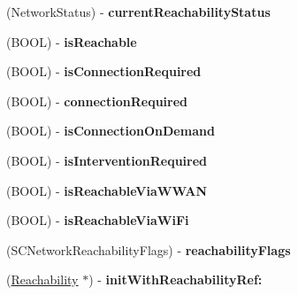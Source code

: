 \begin{DoxyCompactItemize}
\item 
\hypertarget{interface_reachability_a8396438436e7ff3770039fb527cd1d34}{
(\-Network\-Status) -\/ {\bfseries current\-Reachability\-Status}}
\label{interface_reachability_a8396438436e7ff3770039fb527cd1d34}

\item 
\hypertarget{interface_reachability_ae0b18fcacc97f538502cf671aa583dbd}{
(\-B\-O\-O\-L) -\/ {\bfseries is\-Reachable}}
\label{interface_reachability_ae0b18fcacc97f538502cf671aa583dbd}

\item 
\hypertarget{interface_reachability_a294f9407cd32a05f26a480871df70901}{
(\-B\-O\-O\-L) -\/ {\bfseries is\-Connection\-Required}}
\label{interface_reachability_a294f9407cd32a05f26a480871df70901}

\item 
\hypertarget{interface_reachability_a731496d70dd8bfbd1b364df13cac2b4c}{
(\-B\-O\-O\-L) -\/ {\bfseries connection\-Required}}
\label{interface_reachability_a731496d70dd8bfbd1b364df13cac2b4c}

\item 
\hypertarget{interface_reachability_af5bea7c2cfd6439a4ff5f0ab0b92e37b}{
(\-B\-O\-O\-L) -\/ {\bfseries is\-Connection\-On\-Demand}}
\label{interface_reachability_af5bea7c2cfd6439a4ff5f0ab0b92e37b}

\item 
\hypertarget{interface_reachability_ad44af2ebf5ffd986dacad06e63362550}{
(\-B\-O\-O\-L) -\/ {\bfseries is\-Intervention\-Required}}
\label{interface_reachability_ad44af2ebf5ffd986dacad06e63362550}

\item 
\hypertarget{interface_reachability_a20011128b407d36659bc78a64cd583f5}{
(\-B\-O\-O\-L) -\/ {\bfseries is\-Reachable\-Via\-W\-W\-A\-N}}
\label{interface_reachability_a20011128b407d36659bc78a64cd583f5}

\item 
\hypertarget{interface_reachability_a994f39db8e47480480ffd7ee81159ecb}{
(\-B\-O\-O\-L) -\/ {\bfseries is\-Reachable\-Via\-Wi\-Fi}}
\label{interface_reachability_a994f39db8e47480480ffd7ee81159ecb}

\item 
\hypertarget{interface_reachability_ac9080e40006cd8c82431a668ec8bfe18}{
(\-S\-C\-Network\-Reachability\-Flags) -\/ {\bfseries reachability\-Flags}}
\label{interface_reachability_ac9080e40006cd8c82431a668ec8bfe18}

\item 
\hypertarget{interface_reachability_af8dbb23cc7f9ac59b0269dfaf83979fc}{
(\hyperlink{interface_reachability}{\-Reachability} $\ast$) -\/ {\bfseries init\-With\-Reachability\-Ref\-:}}
\label{interface_reachability_af8dbb23cc7f9ac59b0269dfaf83979fc}


\end{DoxyCompactItemize}
